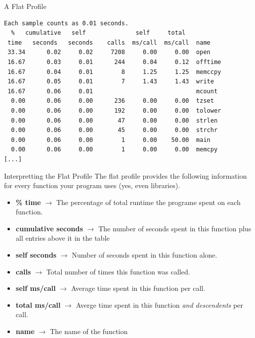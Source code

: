 \documentclass[11pt]{beamer}
\begin{document}


\begin{frame}[fragile = singleslide]{A Flat Profile}
\footnotesize
\begin{verbatim}
Each sample counts as 0.01 seconds.
  %   cumulative   self              self     total
 time   seconds   seconds    calls  ms/call  ms/call  name
 33.34      0.02     0.02     7208     0.00     0.00  open
 16.67      0.03     0.01      244     0.04     0.12  offtime
 16.67      0.04     0.01        8     1.25     1.25  memccpy
 16.67      0.05     0.01        7     1.43     1.43  write
 16.67      0.06     0.01                             mcount
  0.00      0.06     0.00      236     0.00     0.00  tzset
  0.00      0.06     0.00      192     0.00     0.00  tolower
  0.00      0.06     0.00       47     0.00     0.00  strlen
  0.00      0.06     0.00       45     0.00     0.00  strchr
  0.00      0.06     0.00        1     0.00    50.00  main
  0.00      0.06     0.00        1     0.00     0.00  memcpy
[...]
\end{verbatim}
\end{frame}

\begin{frame}{Interpretting the Flat Profile}
The flat profile provides the following information for every function your program uses (yes, even libraries).
\begin{itemize}
\item \textbf{\% time} $\rightarrow$ The percentage of total runtime the programe spent on each function.
\item \textbf{cumulative seconds} $\rightarrow$ The number of seconds spent in this function plus all entries above it in the table  
\item \textbf{self seconds} $\rightarrow$ Number of seconds spent in this function alone.
\item \textbf{calls} $\rightarrow$ Total number of times this function was called.
\item \textbf{self ms/call} $\rightarrow$ Average time spent in this function per call.
\item \textbf{total ms/call} $\rightarrow$ Averge time spent in this function \emph{and descendents} per call.
\item \textbf{name} $\rightarrow$ The name of the function
\end{itemize}
\end{frame}
\end{document}
